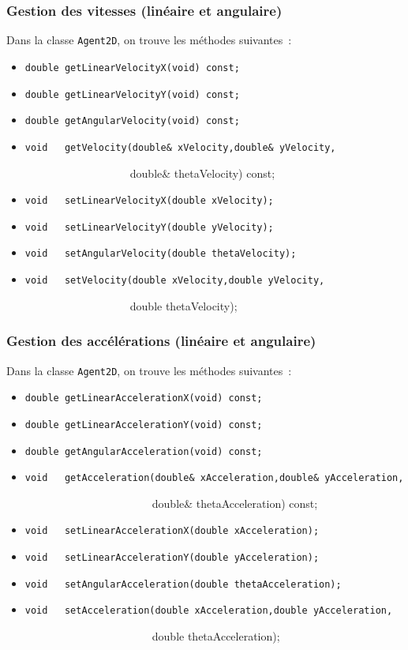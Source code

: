\documentclass[12pt]{article}
\begin{document}
\subsubsection{Gestion des vitesses (lin\'eaire et angulaire)}

Dans la classe {\tt Agent2D}, on trouve les m\'ethodes suivantes~:

\begin{itemize}
\item {\tt double getLinearVelocityX(void) const;}
\item {\tt double getLinearVelocityY(void) const;}
\item {\tt double getAngularVelocity(void) const;}
\item {\tt void~~ getVelocity(double\& xVelocity,double\& yVelocity,

~~~~~~~~~~~~~~~~~~~double\& thetaVelocity) const;}
\item {\tt void~~ setLinearVelocityX(double xVelocity);}
\item {\tt void~~ setLinearVelocityY(double yVelocity);}
\item {\tt void~~ setAngularVelocity(double thetaVelocity);}
\item {\tt void~~ setVelocity(double xVelocity,double yVelocity,

~~~~~~~~~~~~~~~~~~~double thetaVelocity);}
\end{itemize}

\subsubsection{Gestion des acc\'el\'erations (lin\'eaire et angulaire)}

Dans la classe {\tt Agent2D}, on trouve les m\'ethodes suivantes~:

\begin{itemize}
\item {\tt double getLinearAccelerationX(void) const;}
\item {\tt double getLinearAccelerationY(void) const;}
\item {\tt double getAngularAcceleration(void) const;}
\item {\tt void~~ getAcceleration(double\& xAcceleration,double\& yAcceleration,

~~~~~~~~~~~~~~~~~~~~~~~double\& thetaAcceleration) const;}
\item {\tt void~~ setLinearAccelerationX(double xAcceleration);}
\item {\tt void~~ setLinearAccelerationY(double yAcceleration);}
\item {\tt void~~ setAngularAcceleration(double thetaAcceleration);}
\item {\tt void~~ setAcceleration(double xAcceleration,double yAcceleration,

~~~~~~~~~~~~~~~~~~~~~~~double thetaAcceleration);}
\end{itemize}
\end{document}
